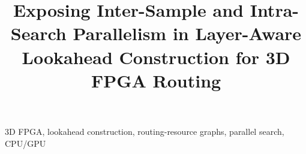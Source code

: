 \documentclass[conference,10pt,letterpaper]{IEEEtran}
\title{Exposing Inter-Sample and Intra-Search Parallelism in Layer-Aware Lookahead Construction for 3D FPGA Routing}
\author{}
\begin{document}
\maketitle
\begin{abstract}\end{abstract}
\begin{IEEEkeywords}3D FPGA, lookahead construction, routing-resource graphs, parallel search, CPU/GPU\end{IEEEkeywords}







\clearpage
{}


\end{document}
